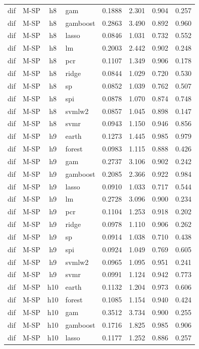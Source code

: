 \begin{ThreePartTable}
\begin{longtable}[t]{llclcccc}
dif & M-SP & h8 & gam & 0.1888 & 2.301 & 0.904 & 0.257\\
dif & M-SP & h8 & gamboost & 0.2863 & 3.490 & 0.892 & 0.960\\
dif & M-SP & h8 & lasso & 0.0846 & 1.031 & 0.732 & 0.552\\
dif & M-SP & h8 & lm & 0.2003 & 2.442 & 0.902 & 0.248\\
dif & M-SP & h8 & pcr & 0.1107 & 1.349 & 0.906 & 0.178\\
dif & M-SP & h8 & ridge & 0.0844 & 1.029 & 0.720 & 0.530\\
dif & M-SP & h8 & sp & 0.0852 & 1.039 & 0.762 & 0.507\\
dif & M-SP & h8 & spi & 0.0878 & 1.070 & 0.874 & 0.748\\
dif & M-SP & h8 & svmlw2 & 0.0857 & 1.045 & 0.898 & 0.147\\
dif & M-SP & h8 & svmr & 0.0943 & 1.150 & 0.946 & 0.856\\
\addlinespace
dif & M-SP & h9 & earth & 0.1273 & 1.445 & 0.985 & 0.979\\
dif & M-SP & h9 & forest & 0.0983 & 1.115 & 0.888 & 0.426\\
dif & M-SP & h9 & gam & 0.2737 & 3.106 & 0.902 & 0.242\\
dif & M-SP & h9 & gamboost & 0.2085 & 2.366 & 0.922 & 0.984\\
dif & M-SP & h9 & lasso & 0.0910 & 1.033 & 0.717 & 0.544\\
dif & M-SP & h9 & lm & 0.2728 & 3.096 & 0.900 & 0.234\\
dif & M-SP & h9 & pcr & 0.1104 & 1.253 & 0.918 & 0.202\\
dif & M-SP & h9 & ridge & 0.0978 & 1.110 & 0.906 & 0.262\\
dif & M-SP & h9 & sp & 0.0914 & 1.038 & 0.710 & 0.438\\
dif & M-SP & h9 & spi & 0.0924 & 1.049 & 0.769 & 0.605\\
dif & M-SP & h9 & svmlw2 & 0.0965 & 1.095 & 0.951 & 0.241\\
dif & M-SP & h9 & svmr & 0.0991 & 1.124 & 0.942 & 0.773\\
\addlinespace
dif & M-SP & h10 & earth & 0.1132 & 1.204 & 0.973 & 0.606\\
dif & M-SP & h10 & forest & 0.1085 & 1.154 & 0.940 & 0.424\\
dif & M-SP & h10 & gam & 0.3512 & 3.734 & 0.900 & 0.255\\
dif & M-SP & h10 & gamboost & 0.1716 & 1.825 & 0.985 & 0.906\\
dif & M-SP & h10 & lasso & 0.1177 & 1.252 & 0.886 & 0.257\\

\end{longtable}
\end{ThreePartTable}
